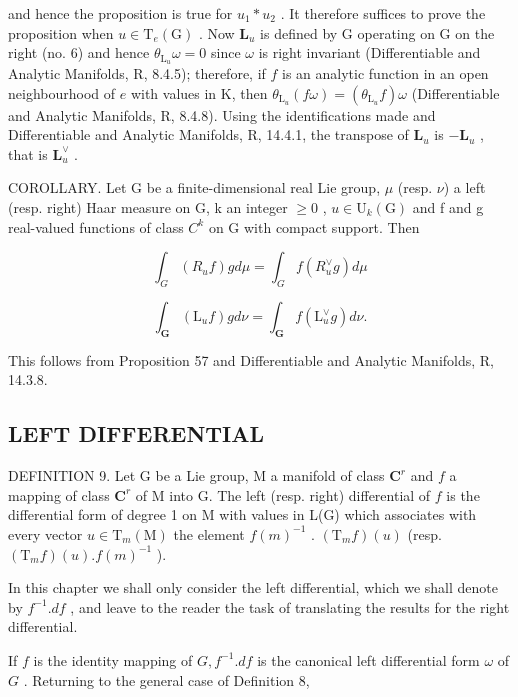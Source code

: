 and hence the proposition is true for \(u_{1} * u_{2}\) . It therefore suffices to prove the proposition when \(u \in \mathrm{T}_{e}(\mathrm{G})\) . Now \(\mathbf{L}_u\) is defined by G operating on G on the right (no. 6) and hence \(\theta_{\mathrm{L}_u}\omega = 0\) since \(\omega\) is right invariant (Differentiable and Analytic Manifolds, R, 8.4.5); therefore, if \(f\) is an analytic function in an open neighbourhood of \(e\) with values in K, then \(\theta_{\mathrm{L}_u}(f\omega) = (\theta_{\mathrm{L}_u}f)\omega\) (Differentiable and Analytic Manifolds, R, 8.4.8). Using the identifications made and Differentiable and Analytic Manifolds, R, 14.4.1, the transpose of \(\mathbf{L}_u\) is \(-\mathbf{L}_u\) , that is \(\mathbf{L}_u^\vee\) .

COROLLARY. Let G be a finite-dimensional real Lie group, \(\mu\) (resp. \(\nu\)) a left (resp. right) Haar measure on G, k an integer \(\geqslant0\) , \(u\in\mathrm{U}_{k}(\mathrm{G})\) and f and g real-valued functions of class \(C^{k}\) on G with compact support. Then

\[
\int_ {G} \left(R _ {u} f\right) g d \mu = \int_ {G} f (R _ {u} ^ {\vee} g) d \mu
\]

\[
\int_ {\mathbf {G}} \left(\mathrm{L} _ {u} f\right) g d \nu = \int_ {\mathbf {G}} f (\mathrm{L} _ {u} ^ {\vee} g) d \nu .
\]

This follows from Proposition 57 and Differentiable and Analytic Manifolds, R, 14.3.8.

\subsection{LEFT DIFFERENTIAL}

DEFINITION 9. Let G be a Lie group, M a manifold of class \(\mathbf{C}^r\) and \(f\) a mapping of class \(\mathbf{C}^r\) of M into G. The left (resp. right) differential of \(f\) is the differential form of degree 1 on M with values in L(G) which associates with every vector \(u \in \mathrm{T}_m(\mathrm{M})\) the element \(f(m)^{-1}\) . \((\mathrm{T}_m f)(u)\) (resp. \((\mathrm{T}_m f)(u). f(m)^{-1}\) ).

In this chapter we shall only consider the left differential, which we shall denote by \(f^{-1}.df\) , and leave to the reader the task of translating the results for the right differential.

If \(f\) is the identity mapping of \(G, f^{-1}.df\) is the canonical left differential form \(\omega\) of \(G\) . Returning to the general case of Definition 8,

